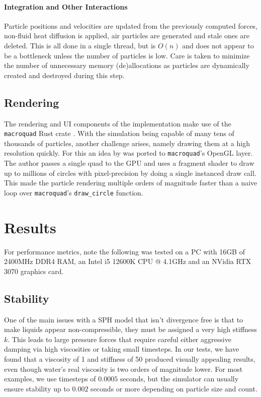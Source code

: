 \documentclass[acmtog,review]{acmart}
\begin{document}
\paragraph*{Integration and Other Interactions} Particle positions and velocities are updated from the previously computed forces, non-fluid heat diffusion is applied, air particles are generated and stale ones are deleted. This is all done in a single thread, but is $O(n)$ and does not appear to be a bottleneck unless the number of particles is low. Care is taken to minimize the number of unnecessary memory (de)allocations as particles are dynamically created and destroyed during this step.

\subsection*{Rendering}
The rendering and UI components of the implementation make use of the \texttt{macroquad} Rust crate \cite{Macroquad}. With the simulation being capable of many tens of thousands of particles, another challenge arises, namely drawing them at a high resolution quickly. For this an idea by \cite{parker20} was ported to \texttt{macroquad}'s OpenGL layer. The author passes a single quad to the GPU and uses a fragment shader to draw up to millions of circles with pixel-precision by doing a single instanced draw call. This made the particle rendering multiple orders of magnitude faster than a naive loop over \texttt{macroquad}'s \texttt{draw\_circle} function. 

\section{Results}
For performance metrics, note the following was tested on a PC with 16GB of 2400MHz DDR4 RAM, an Intel i5 12600K CPU @ 4.1GHz and an NVidia RTX 3070 graphics card. 
\subsection{Stability}
One of the main issues with a SPH model that isn't divergence free is that to make liquids appear non-compressible, they must be assigned a very high stiffness $k$. This leads to large pressure forces that require careful either aggressive damping via high viscosities or taking small timesteps. In our tests, we have found that a viscosity of 1 and stiffness of 50 produced visually appealing results, even though water's real viscosity is two orders of magnitude lower. For most examples, we use timesteps of $0.0005$ seconds, but the simulator can usually ensure stability up to $0.002$ seconds or more depending on particle size and count. 
\end{document}
